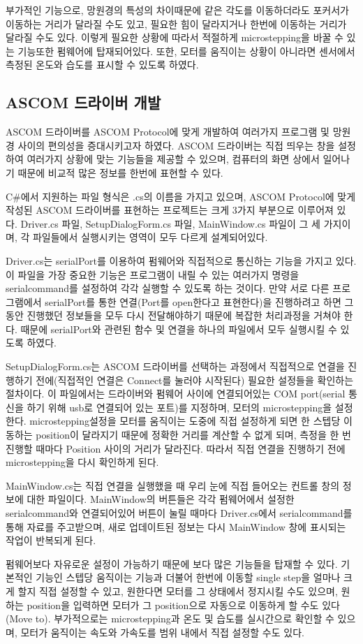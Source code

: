 부가적인 기능으로, 망원경의 특성의 차이때문에 같은 각도를 이동하더라도 포커서가 이동하는 거리가 달라질 수도 있고, 필요한 힘이 달라지거나 한번에 이동하는 거리가 달라질 수도 있다. 이렇게 필요한 상황에 따라서 적절하게 microstepping을 바꿀 수 있는 기능또한 펌웨어에 탑재되어있다. 또한, 모터를 움직이는 상황이 아니라면 센서에서 측정된 온도와 습도를 표시할 수 있도록 하였다.

\subsection{ASCOM 드라이버 개발}

ASCOM 드라이버를 ASCOM Protocol에 맞게 개발하여 여러가지 프로그램 및 망원경 사이의 편의성을 증대시키고자 하였다. ASCOM 드라이버는 직접 띄우는 창을 설정하여 여러가지 상황에 맞는 기능들을 제공할 수 있으며, 컴퓨터의 화면 상에서 일어나기 때문에 비교적 많은 정보를 한번에 표현할 수 있다.

C\#에서 지원하는 파일 형식은 .cs의 이름을 가지고 있으며, ASCOM Protocol에 맞게 작성된 ASCOM 드라이버를 표현하는 프로젝트는 크게 3가지 부분으로 이루어져 있다. Driver.cs 파일, SetupDialogForm.cs 파일, MainWindow.cs 파일이 그 세 가지이며, 각 파일들에서 실행시키는 영역이 모두 다르게 설계되어있다.

Driver.cs는 serialPort를 이용하여 펌웨어와 직접적으로 통신하는 기능을 가지고 있다. 이 파일을 가장 중요한 기능은 프로그램이 내릴 수 있는 여러가지 명령을 serialcommand를 설정하여 각각 실행할 수 있도록 하는 것이다. 만약 서로 다른 프로그램에서 serialPort를 통한 연결(Port를 open한다고 표현한다)을 진행하려고 하면 그동안 진행했던 정보들을 모두 다시 전달해야하기 때문에 복잡한 처리과정을 거쳐야 한다. 때문에 serialPort와 관련된 함수 및 연결을 하나의 파일에서 모두 실행시킬 수 있도록 하였다.

SetupDialogForm.cs는 ASCOM 드라이버를 선택하는 과정에서 직접적으로 연결을 진행하기 전에(직접적인 연결은 Connect를 눌러야 시작된다) 필요한 설정들을 확인하는 절차이다. 이 파일에서는 드라이버와 펌웨어 사이에 연결되어있는 COM port(serial 통신을 하기 위해 usb로 연결되어 있는 포트)를 지정하며, 모터의 microstepping을 설정한다. microstepping설정을 모터를 움직이는 도중에 직접 설정하게 되면 한 스텝당 이동하는 position이 달라지기 때문에 정확한 거리를 계산할 수 없게 되며, 측정을 한 번 진행할 때마다 Position 사이의 거리가 달라진다. 따라서 직접 연결을 진행하기 전에 microstepping을 다시 확인하게 된다.

MainWindow.cs는 직접 연결을 실행했을 때 우리 눈에 직접 들어오는 컨트롤 창의 정보에 대한 파일이다. MainWindow의 버튼들은 각각 펌웨어에서 설정한 serialcommand와 연결되어있어 버튼이 눌릴 때마다 Driver.cs에서 serialcommand를 통해 자료를 주고받으며, 새로 업데이트된 정보는 다시 MainWindow 창에 표시되는 작업이 반복되게 된다. 

펌웨어보다 자유로운 설정이 가능하기 때문에 보다 많은 기능들을 탑재할 수 있다. 기본적인 기능인 스텝당 움직이는 기능과 더불어 한번에 이동할 single step을 얼마나 크게 할지 직접 설정할 수 있고, 원한다면 모터를 그 상태에서 정지시킬 수도 있으며, 원하는 position을 입력하면 모터가 그 position으로 자동으로 이동하게 할 수도 있다(Move to). 부가적으로는 microstepping과 온도 및 습도를 실시간으로 확인할 수 있으며, 모터가 움직이는 속도와 가속도를 범위 내에서 직접 설정할 수도 있다.